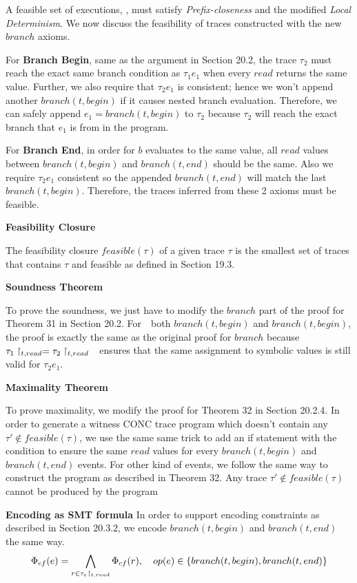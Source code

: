 \documentclass{article}
\begin{document}
\begin{enumerate}
A feasible set of executions, \F, must satisfy \emph{Prefix-closeness} and
the modified \emph{Local Determinism}.
We now discuss the feasibility of traces constructed with the new $branch$ axioms.

For \textbf{Branch Begin}, same as the argument in Section 20.2, the trace $\tau_2$ must reach
the exact same branch condition as $\tau_1 e_1$ when every $read$ returns the
same value.
Further, we also require that $\tau_2 e_1$ is consistent;
hence we won't append another $branch(t, begin)$ if it causes nested branch evaluation.
Therefore, we can safely append $e_1 = branch(t, begin)$ to $\tau_2$
because $\tau_2$ will reach the exact branch that $e_1$ is from in the program.

For \textbf{Branch End}, in order for $b$ evaluates to the same value,
all $read$ values between $branch(t, begin)$ and $branch(t, end)$ should be the same.
Also we require $\tau_2 e_1$ consistent so the appended $branch(t, end)$ will match
the last $branch(t, begin)$.
Therefore, the traces inferred from these 2 axioms must be feasible.

\textbf{Feasibility Closure}

The feasibility closure $feasible(\tau)$ of a given trace $\tau$ is the smallest set
of traces that contains $\tau$ and feasible as defined in Section 19.3.  

\textbf{Soundness Theorem}

To prove the soundness, we just have to modify the $branch$ part of the proof for
Theorem 31 in Section 20.2.
For　both $branch(t, begin)$ and $branch(t, begin)$,
the proof is exactly the same as the original proof for $branch$
because $\tau_1\upharpoonright_{t,read} = \tau_2\upharpoonright_{t,read}$　ensures
that the same assignment to symbolic values is still valid for $\tau_2 e_1$.

\textbf{Maximality Theorem}

To prove maximality, we modify the proof for Theorem 32 in Section 20.2.4.
In order to generate a witness CONC trace program which doesn't contain any 
$\tau' \notin feasible(\tau)$,
we use the same same trick to add an if statement with the condition
to ensure the same $read$ values for every $branch(t, begin)$ and
$branch(t, end)$ events.
For other kind of events, we follow the same way to construct the program
as described in Theorem 32. 
Any trace $\tau'\notin feasible(\tau)$ cannot be produced by the program

\textbf{Encoding as SMT formula}
In order to support encoding constraints as described in Section 20.3.2,
we encode $branch(t, begin)$ and $branch(t, end)$ the same way.
$$
\Phi_{cf}(e) = \bigwedge_{r \in \tau_e \upharpoonright_{t, read}} \Phi_{cf}(r),
\quad op(e) \in \{branch(t, begin), branch(t, end)\}
$$


\end{enumerate}
\end{document}
